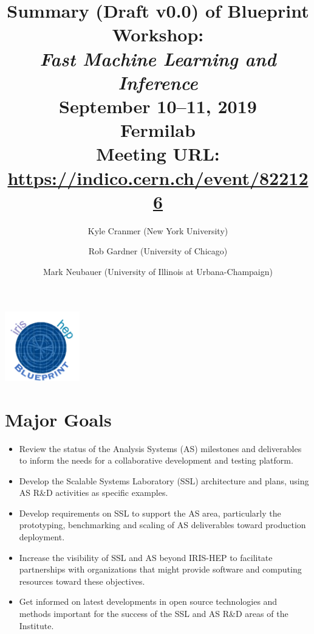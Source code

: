 \documentclass[11pt,letterpaper,fleqn]{article}
\date{} %
\title{\large Summary (Draft v0.0) of Blueprint Workshop: \\
\vspace{1pt}
\LARGE \textit{Fast Machine Learning and Inference} \\
\color{black} \normalsize
\vspace{10pt}
September 10--11, 2019 \\
Fermilab \\
Meeting URL: \href{https://indico.cern.ch/event/822126}{https://indico.cern.ch/event/822126}
} %
\author{Kyle Cranmer {\normalfont(New York University)}
      \and  Rob Gardner {\normalfont(University of Chicago)}
      \and  Mark Neubauer {\normalfont(University of Illinois at Urbana-Champaign)}
      }
\begin{document}
\maketitle %
\normalfont

\thispagestyle{firststyle}

\vspace{-250pt}
\hspace{360pt}
\includegraphics[height=30mm]{../../../figures/iris-hep-bluprint-logo.png}

\vspace{120pt}
\section*{Major Goals}
\vspace{3pt}
\begin{itemize}
  \item Review the status of the Analysis Systems (AS) milestones and deliverables to inform the needs for a collaborative development and testing platform.
  \item Develop the Scalable Systems Laboratory (SSL) architecture and plans, using AS R\&D activities as specific examples.
  \item Develop requirements on SSL to support the AS area, particularly the prototyping, benchmarking and scaling of AS deliverables toward production deployment.
  \item Increase the visibility of SSL and AS beyond IRIS-HEP to facilitate partnerships with organizations that might provide software and computing resources toward these objectives.
  \item Get informed on latest developments in open source technologies and methods important for the success of the SSL and AS R\&D areas of the Institute.
\end{itemize}
\end{document}
